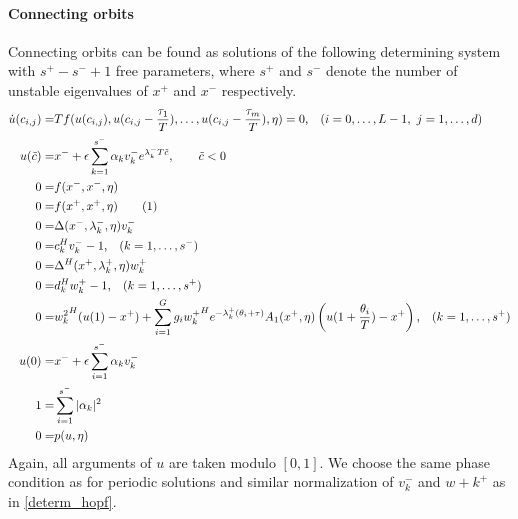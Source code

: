 \documentclass[10pt]{scrartcl}
\newcommand\numberthis{\addtocounter{equation}{1}\tag{\theequation}}
\begin{document}
{\paragraph{Connecting orbits}
Connecting orbits can be found as solutions of the following
determining system with $s^+-s^-+1$ free parameters, where $s^+$ and
$s^-$ denote the number of unstable eigenvalues of $x^+$ and $x^-$
respectively.
{\allowdisplaybreaks
\begin{align*}
  \dot{u}(c_{i,j})=& Tf(u(c_{i,j}),u(c_{i,j}-\frac{\tau_1}{T}),\ldots,
  u(c_{i,j}-\frac{\tau_m}{T}),\eta)=0\mbox{,\quad}(i=0,\ldots,L-1,\ j=1,\ldots,d) \\
  u(\tilde{c})=&x^{-}+\epsilon
  \sum_{k=1}^{s^{-}}\alpha_{k}v_{k}^{-}e^{\lambda_{k}^{-}T\tilde{c}}, \qquad \tilde{c}<0\\
  0=&f(x^{-},x^{-},\eta)\\
  0=&f(x^{+},x^{+},\eta)\numberthis\label{determ_hcli}\\
  0=&\Delta(x^{-},\lambda_k^-,\eta) v_{k}^{-} \\
  0=&c_k^{H}v_{k}^{-}-1\mbox{,\quad} (k=1,\ldots,s^{-})\\
  0=&\Delta^{H}(x^{+},\lambda_k^+,\eta)w_{k}^{+} \\
  0=&d_k^{H}w_{k}^{+}-1\mbox{,\quad} (k=1,\ldots,s^{+})\\
  0=&{w_{k}^{2}}^{H}(u(1)-x^{+})+\sum_{i=1}^{G}g_i{w_{k}^{+}}^{H}e^{-\lambda_{k}^{+}
    (\theta_i+\tau)}A_{1}(x^{+},\eta)
  \left(u(1+\frac{\theta_i}{T})-x^{+}\right)\mbox{,\quad}(k=1,\ldots,s^+)\\
  u(0)=&x^{-}+\epsilon\sum_{i=1}^{s^{-}}\alpha_{k}v_{k}^{-}\\
  1=&\sum_{i=1}^{s^-}|\alpha_{k}|^{2}\\
  0=&p(u,\eta)
\end{align*}
}Again, all arguments of $u$ are taken modulo $[0,1]$. We choose the
same phase condition as for periodic solutions and similar
normalization of $v_k^-$ and $w+k^+$ as in \eqref{determ_hopf}.

}
\end{document}
